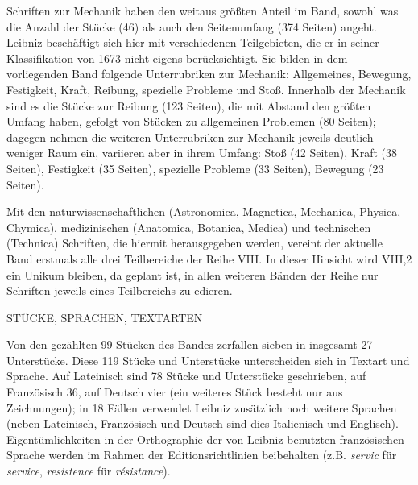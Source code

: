 Schriften zur Mechanik haben den weitaus größten Anteil im Band, sowohl was die Anzahl der Stücke (46) als auch den Seitenumfang (374 Seiten) angeht. Leibniz beschäftigt sich hier mit verschiedenen Teilgebieten, die er in seiner Klassifikation von 1673 nicht eigens berücksichtigt. Sie bilden in dem vorliegenden Band folgende Unterrubriken zur Mechanik: Allgemeines, Bewegung, Festigkeit, Kraft, Reibung, spezielle Probleme und Stoß. Innerhalb der Mechanik sind es die Stücke zur Reibung (123 Seiten), die mit Abstand den größten Umfang haben, gefolgt von Stücken zu allgemeinen Problemen (80 Seiten); dagegen nehmen die weiteren Unterrubriken zur Mechanik jeweils deutlich weniger Raum ein, variieren aber in ihrem Umfang: Stoß (42 Seiten), Kraft (38 Seiten), Festigkeit (35 Seiten), spezielle Probleme (33 Seiten), Bewegung (23 Seiten). \par
Mit den naturwissenschaftlichen (Astronomica, Magnetica, Mechanica, Physica, Chymica), medizinischen (Anatomica, Botanica, Medica) und technischen (Technica) Schriften, die hiermit herausgegeben werden, vereint der aktuelle Band erstmals alle drei Teilbereiche der Reihe VIII. In dieser Hinsicht wird VIII,2 ein Unikum bleiben, da geplant ist, in allen weiteren Bänden der Reihe nur Schriften jeweils eines Teilbereichs zu edieren. 
\par\vspace{6.0ex}
\noindent
\noindent\uppercase{Stücke, Sprachen, Textarten}
\par\vspace{1.0ex}
\noindent
Von den gezählten 99 Stücken des Bandes zerfallen sieben in insgesamt 27 Unterstücke. Diese 119 Stücke und Unterstücke unterscheiden sich in Textart und Sprache. Auf Lateinisch sind 78 Stücke und Unterstücke geschrieben, auf Französisch 36, auf Deutsch vier (ein weiteres Stück besteht nur aus Zeichnungen); in 18 Fällen verwendet Leibniz zusätzlich noch weitere Sprachen (neben Lateinisch, Französisch und Deutsch sind dies Italienisch und Englisch). Eigentümlichkeiten in der Orthographie der von Leibniz benutzten französischen Sprache werden im Rahmen der Editionsrichtlinien beibehalten (z.B. \textit{servic} für \textit{service}, \textit{resistence} für \textit{résistance}).\par
\newpage
